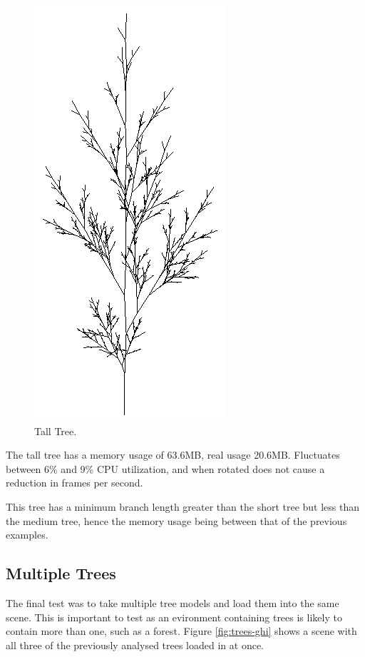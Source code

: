 \documentclass[final]{cmpreport}
\begin{document}
\begin{figure}[ht]
    \includegraphics[scale=0.7]{tree-i.PNG} 
    \centering
    \captionsetup{justification=centering}
    \caption{Tall Tree.}
    \label{fig:tree-i}
\end{figure}

The tall tree has a memory usage of 63.6MB, real usage 20.6MB. Fluctuates between 6\% and 9\% 
CPU utilization, and when rotated does not cause a reduction in frames per second.

This tree has a minimum branch length greater than the short tree but less than the medium tree,
hence the memory usage being between that of the previous examples.

\pagebreak
\subsection{Multiple Trees}
The final test was to take multiple tree models and load them into the same scene. This is 
important to test as an evironment containing trees is likely to contain more than one, such as 
a forest. Figure \ref{fig:trees-ghi} shows a scene with all three of the previously analysed 
trees loaded in at once. 
\end{document}
